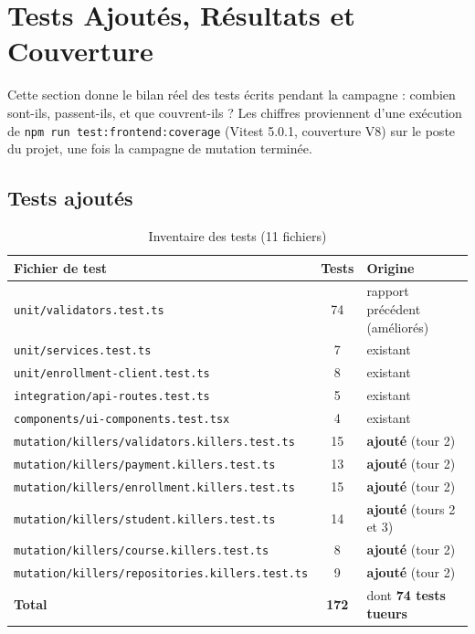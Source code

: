\documentclass[12pt,a4paper]{article}
\begin{document}
\section{Tests Ajoutés, Résultats et Couverture}
Cette section donne le bilan réel des tests écrits pendant la campagne : combien sont-ils, passent-ils, et que couvrent-ils ? Les chiffres proviennent d'une exécution de \texttt{npm run test:frontend:coverage} (Vitest 5.0.1, couverture V8) sur le poste du projet, une fois la campagne de mutation terminée.

\subsection{Tests ajoutés}
\begin{table}[H]
\centering
\footnotesize
\begin{tabular}{p{8.6cm}cp{3.6cm}}
\toprule
\textbf{Fichier de test} & \textbf{Tests} & \textbf{Origine} \\
\midrule
\texttt{unit/validators.test.ts} & 74 & rapport précédent (améliorés) \\
\texttt{unit/services.test.ts} & 7 & existant \\
\texttt{unit/enrollment-client.test.ts} & 8 & existant \\
\texttt{integration/api-routes.test.ts} & 5 & existant \\
\texttt{components/ui-components.test.tsx} & 4 & existant \\
\midrule
\texttt{mutation/killers/validators.killers.test.ts} & 15 & \textbf{ajouté} (tour 2) \\
\texttt{mutation/killers/payment.killers.test.ts} & 13 & \textbf{ajouté} (tour 2) \\
\texttt{mutation/killers/enrollment.killers.test.ts} & 15 & \textbf{ajouté} (tour 2) \\
\texttt{mutation/killers/student.killers.test.ts} & 14 & \textbf{ajouté} (tours 2 et 3) \\
\texttt{mutation/killers/course.killers.test.ts} & 8 & \textbf{ajouté} (tour 2) \\
\texttt{mutation/killers/repositories.killers.test.ts} & 9 & \textbf{ajouté} (tour 2) \\
\midrule
\textbf{Total} & \textbf{172} & dont \textbf{74 tests tueurs} \\
\bottomrule
\end{tabular}
\caption{Inventaire des tests (11 fichiers)}
\end{table}
\end{document}
